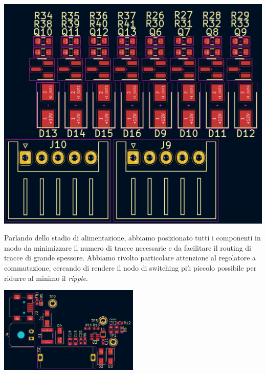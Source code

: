 \begin{center}
\includegraphics[scale=0.3]{figures/image55.png}
\captionsetup{type=figure}
\end{center}

\noindent Parlando dello stadio di alimentazione, abbiamo posizionato tutti i
componenti in modo da minimizzare il numero di tracce necessarie e da
facilitare il routing di tracce di grande spessore. Abbiamo rivolto
particolare attenzione al regolatore a commutazione, cercando di rendere
il nodo di switching più piccolo possibile per ridurre al minimo il
\textit{ripple}.

\begin{center}
\includegraphics[width=0.5\textwidth]{figures/image56.png}
\captionsetup{type=figure}
\end{center}


